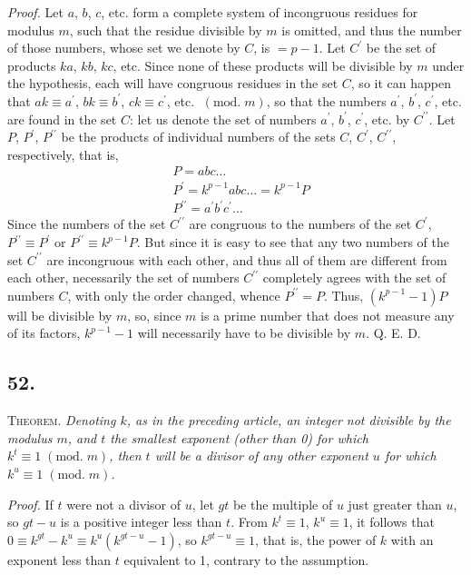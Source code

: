 \documentclass[twoside,12pt, showframe]{memoir}
\renewcommand{\pmod}[1]{\;(\textrm{mod.}\;#1)}
\begin{document}
\textit{Proof.} Let \(a\), \(b\), \(c\), etc. form a complete system of incongruous residues for modulus \(m\), such that the residue divisible by \(m\) is omitted, and thus the number of those numbers, whose set we denote by \(C\), is \(=p-1\). Let \(C^{\prime}\) be the set of products \(k a\), \(k b\), \(k c\), etc. Since none of these products will be divisible by \(m\) under the hypothesis, each will have congruous residues in the set \(C\), so it can happen that \(a k \equiv a^{\prime}\), \(b k \equiv b^{\prime}\), \(c k \equiv c^{\prime}\), etc. \(\pmod{m}\), so that the numbers \(a^{\prime}\), \(b^{\prime}\), \(c^{\prime}\), etc. are found in the set \(C\): let us denote the set of numbers \(a^{\prime}\), \(b^{\prime}\), \(c^{\prime}\), etc. by \(C^{\prime \prime}\). Let \(P\), \(P^{\prime}\), \(P^{\prime \prime}\) be the products of individual numbers of the sets \(C\), \(C^{\prime}\), \(C^{\prime \prime}\), respectively, that is,
\[\begin{aligned}
& P=a b c \ldots \\
& P^{\prime}=k^{p-1} a b c \ldots=k^{p-1} P \\
& P^{\prime \prime}=a^{\prime} b^{\prime} c^{\prime} \ldots
\end{aligned}\]
Since the numbers of the set \(C^{\prime \prime}\) are congruous to the numbers of the set \(C^{\prime}\), \(P^{\prime \prime} \equiv P^{\prime}\) or \(P^{\prime \prime} \equiv k^{p-1} P\). But since it is easy to see that any two numbers of the set \(C^{\prime \prime}\) are incongruous with each other, and thus all of them are different from each other, necessarily the set of numbers \(C^{\prime \prime}\) completely agrees with the set of numbers \(C\), with only the order changed, whence \(P^{\prime \prime}=P\). Thus, \((k^{p-1}-1) P\) will be divisible by \(m\), so, since \(m\) is a prime number that does not measure any of its factors, \(k^{p-1}-1\) will necessarily have to be divisible by \(m\). Q. E. D.
%

\subsection*{52.}

\textsc{Theorem.} \textit{Denoting \(k\), as in the preceding article, an integer not divisible by the modulus \(m\), and \(t\) the smallest exponent (other than 0) for which \(k^{t} \equiv 1\pmod{m}\), then \(t\) will be a divisor of any other exponent \(u\) for which \(k^{u} \equiv 1\pmod{m}\).}

\textit{Proof.} If \(t\) were not a divisor of \(u\), let \(g t\) be the multiple of \(u\) just greater than \(u\), so \(g t-u\) is a positive integer less than \(t\). From \(k^{t} \equiv 1\), \(k^{u} \equiv 1\), it follows that \(0 \equiv k^{g t}-k^{u} \equiv k^{u}(k^{g t-u}-1)\), so \(k^{g t-u} \equiv 1\), that is, the power of \(k\) with an exponent less than \(t\) equivalent to 1, contrary to the assumption.
\end{document}
